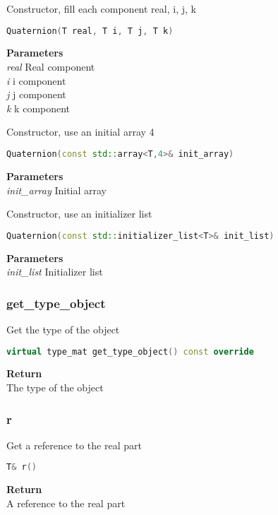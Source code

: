 \begin{mdframed}
Constructor, fill each component real, i, j, k
\begin{lstlisting}[language=C++]
Quaternion(T real, T i, T j, T k)
\end{lstlisting}
\textbf{Parameters} \\ 
\textit{real} Real component \\ 
\textit{i} i component \\ 
\textit{j} j component \\ 
\textit{k} k component \\ 
\end{mdframed}

\begin{mdframed}
Constructor, use an initial array 4
\begin{lstlisting}[language=C++]
Quaternion(const std::array<T,4>& init_array)
\end{lstlisting}
\textbf{Parameters} \\ 
\textit{init\_array} Initial array \\ 
\end{mdframed}

\begin{mdframed}
Constructor, use an initializer list
\begin{lstlisting}[language=C++]
Quaternion(const std::initializer_list<T>& init_list)
\end{lstlisting}
\textbf{Parameters} \\ 
\textit{init\_list} Initializer list \\ 
\end{mdframed}

\subsubsection{get\_type\_object}
\begin{mdframed}
Get the type of the object
\begin{lstlisting}[language=C++]
virtual type_mat get_type_object() const override 
\end{lstlisting}
\textbf{Return} \\ 
The type of the object\\ 
\end{mdframed}

\subsubsection{r}
\begin{mdframed}
Get a reference to the real part
\begin{lstlisting}[language=C++]
T& r()
\end{lstlisting}
\textbf{Return} \\ 
A reference to the real part\\ 
\end{mdframed}

